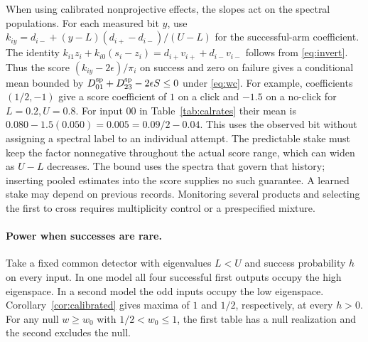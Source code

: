 \documentclass[11pt,letterpaper]{article}
\begin{document}
When using calibrated nonprojective effects, the slopes act on the spectral populations. For each measured bit $y$, use $k_{iy}=d_{i-}+(y-L)(d_{i+}-d_{i-})/(U-L)$ for the successful-arm coefficient. The identity $k_{i1}z_i+k_{i0}(s_i-z_i)=d_{i+}v_{i+}+d_{i-}v_{i-}$ follows from \eqref{eq:invert}. Thus the score $(k_{iy}-2\epsilon)/\pi_i$ on success and zero on failure gives a conditional mean bounded by $D^{\rm sp}_{01}+D^{\rm sp}_{23}-2\epsilon S\le0$ under \eqref{eq:wc}. For example, coefficients $(1/2,-1)$ give a score coefficient of $1$ on a click and $-1.5$ on a no-click for $L=0.2,U=0.8$. For input $00$ in Table~\ref{tab:calrates} their mean is $0.080-1.5(0.050)=0.005=0.09/2-0.04$. This uses the observed bit without assigning a spectral label to an individual attempt. The predictable stake must keep the factor nonnegative throughout the actual score range, which can widen as $U-L$ decreases. The bound uses the spectra that govern that history; inserting pooled estimates into the score supplies no such guarantee. A learned stake may depend on previous records. Monitoring several products and selecting the first to cross requires multiplicity control or a prespecified mixture.

\paragraph{Power when successes are rare.}
Take a fixed common detector with eigenvalues $L<U$ and success probability $h$ on every input. In one model all four successful first outputs occupy the high eigenspace. In a second model the odd inputs occupy the low eigenspace. Corollary~\ref{cor:calibrated} gives maxima of $1$ and $1/2$, respectively, at every $h>0$. For any null $w\ge w_0$ with $1/2<w_0\le1$, the first table has a null realization and the second excludes the null.
\end{document}
